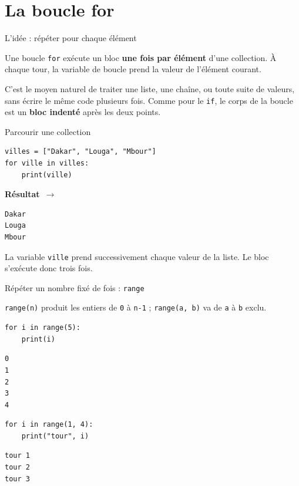 \documentclass[aspectratio=169,11pt]{beamer}
\newcommand{\resultat}{{\scriptsize\textbf{R\'esultat}~$\rightarrow$}\par\vspace{1pt}}
\begin{document}
\section{La boucle for}

\begin{frame}{L'idée : répéter pour chaque élément}
\begin{ucaddef}
{\small Une boucle \texttt{for} exécute un bloc \textbf{une fois par élément} d'une collection. À chaque tour, la variable de boucle prend la valeur de l'élément courant.}
\end{ucaddef}
{\small C'est le moyen naturel de traiter une liste, une chaîne, ou toute suite de valeurs, sans écrire le même code plusieurs fois. Comme pour le \texttt{if}, le corps de la boucle est un \textbf{bloc indenté} après les deux points.}
\end{frame}

\begin{frame}[fragile]{Parcourir une collection}
\begin{lstlisting}
villes = ["Dakar", "Louga", "Mbour"]
for ville in villes:
    print(ville)
\end{lstlisting}
\resultat
\begin{lstlisting}[style=out]
Dakar
Louga
Mbour
\end{lstlisting}
{\small La variable \texttt{ville} prend successivement chaque valeur de la liste. Le bloc s'exécute donc trois fois.}
\end{frame}

\begin{frame}[fragile]{Répéter un nombre fixé de fois : \texttt{range}}
\begin{ucadex}
{\small \texttt{range(n)} produit les entiers de \texttt{0} à \texttt{n-1} ; \texttt{range(a, b)} va de \texttt{a} à \texttt{b} exclu.}
\end{ucadex}
\begin{lstlisting}
for i in range(5):
    print(i)
\end{lstlisting}
\begin{lstlisting}[style=out]
0
1
2
3
4
\end{lstlisting}
\begin{lstlisting}
for i in range(1, 4):
    print("tour", i)
\end{lstlisting}
\begin{lstlisting}[style=out]
tour 1
tour 2
tour 3
\end{lstlisting}
\end{frame}
\end{document}
